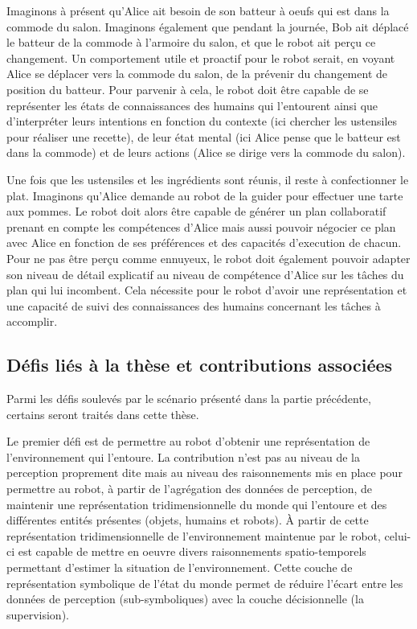 \documentclass[a4paper,11pt,twoside]{StyleThese}
\begin{document}
Imaginons à présent qu'Alice ait besoin de son batteur à oeufs qui est dans la commode du salon. Imaginons également que pendant la journée, Bob ait déplacé le batteur de la commode à l'armoire du salon, et que le robot ait perçu ce changement.
Un comportement utile et proactif pour le robot serait, en voyant Alice se déplacer vers la commode du salon, de la prévenir du changement de position du batteur.
Pour parvenir à cela, le robot doit être capable de se représenter les états de connaissances des humains qui l'entourent ainsi que d'interpréter leurs intentions en fonction du contexte (ici chercher les ustensiles pour réaliser une recette), de leur état mental (ici Alice pense que le batteur est dans la commode) et de leurs actions (Alice se dirige vers la commode du salon).

Une fois que les ustensiles et les ingrédients sont réunis, il reste à confectionner le plat. Imaginons qu'Alice demande au robot de la guider pour effectuer une tarte aux pommes. Le robot doit alors être capable de générer un plan collaboratif prenant en compte les compétences d'Alice mais aussi pouvoir négocier ce plan avec Alice en fonction de ses préférences et des capacités d'execution de chacun.
Pour ne pas être perçu comme ennuyeux, le robot doit également pouvoir adapter son niveau de détail explicatif au niveau de compétence d'Alice sur les tâches du plan qui lui incombent.
Cela nécessite pour le robot d'avoir une représentation et une capacité de suivi des connaissances des humains concernant les tâches à accomplir.




\subsection{Défis liés à la thèse et contributions associées}
Parmi les défis soulevés par le scénario présenté dans la partie précédente, certains seront traités dans cette thèse.

Le premier défi est de permettre au robot d'obtenir une représentation de l'environnement qui l'entoure. La contribution n'est pas au niveau de la perception proprement dite mais au niveau des raisonnements mis en place pour permettre au robot, à partir de l'agrégation des données de perception, de maintenir une représentation tridimensionnelle du monde qui l'entoure et des différentes entités présentes (objets, humains et robots). À partir de cette représentation tridimensionnelle de l'environnement maintenue par le robot, celui-ci est capable  de mettre en oeuvre divers raisonnements spatio-temporels permettant d'estimer la situation de l'environnement. Cette couche de représentation symbolique de l'état du monde permet de réduire l'écart entre les données de perception (sub-symboliques) avec la couche décisionnelle (la supervision).
\end{document}
